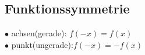 \subsection*{Funktionssymmetrie}
    $\bullet$ achsen(gerade): $f(-x) = f(x)$\\
    $\bullet$ punkt(ungerade):$f(-x) = -f(x)$
